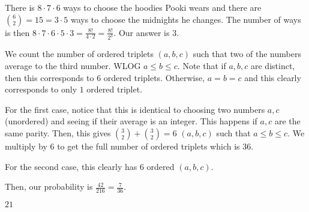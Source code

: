 \documentclass[11pt]{article}
\begin{document}
\begin{sol} 
There is $8\cdot 7\cdot 6$ ways to choose the hoodies Pooki wears and there are $\binom{6}{2}=15=3\cdot 5$ ways to choose the midnights he changes. The number of ways is then $8\cdot 7\cdot 6\cdot 5\cdot 3 = \frac{8!}{4\cdot 2}=\frac{8!}{2^{3}}$. Our answer is $\boxed{3}$.
\end{sol}


\begin{sol} 
We count the number of ordered triplets $(a,b,c)$ such that two of the numbers average to the third number. WLOG $a\leq b\leq c$. Note that if $a,b,c$ are distinct, then this corresponds to $6$ ordered triplets. Otherwise, $a=b=c$ and this clearly corresponds to only $1$ ordered triplet.

For the first case, notice that this is identical to choosing two numbers $a,c$ (unordered) and seeing if their average is an integer. This happens if $a,c$ are the same parity. Then, this gives $\binom{3}{2} + \binom{3}{2}=6$ $(a,b,c)$ such that $a\leq b\leq c$. We multiply by $6$ to get the full number of ordered triplets which is $36$.

For the second case, this clearly has $6$ ordered $(a,b,c)$.

Then, our probability is $\frac{42}{216}=\boxed{\frac{7}{36}}$.
\end{sol}


\begin{sol}
$\boxed{21}$
\end{sol}

\end{document}
